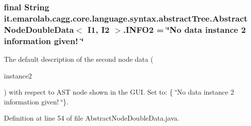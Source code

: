 \hypertarget{classit_1_1emarolab_1_1cagg_1_1core_1_1language_1_1syntax_1_1abstractTree_1_1AbstractNodeDoubleData_3_01I1_00_01I2_01_4_a32d9370361e05707407e8e10294759c8}{
\subsubsection[{I\-N\-F\-O2}]{\setlength{\rightskip}{0pt plus 5cm}final String it.\-emarolab.\-cagg.\-core.\-language.\-syntax.\-abstract\-Tree.\-Abstract\-Node\-Double\-Data$<$ I1, I2 $>$.I\-N\-F\-O2 = \char`\"{}No data instance 2 information given! \char`\"{}\hspace{0.3cm}{\ttfamily [static]}}}\label{classit_1_1emarolab_1_1cagg_1_1core_1_1language_1_1syntax_1_1abstractTree_1_1AbstractNodeDoubleData_3_01I1_00_01I2_01_4_a32d9370361e05707407e8e10294759c8}
The default description of the second node data (
\begin{DoxyCode}
instance2 
\end{DoxyCode}
 ) with respect to A\-S\-T node shown in the G\-U\-I. Set to\-: \{ \char`\"{}\-No data instance 2 information given! \char`\"{}\}. 

Definition at line 54 of file Abstract\-Node\-Double\-Data.\-java.

